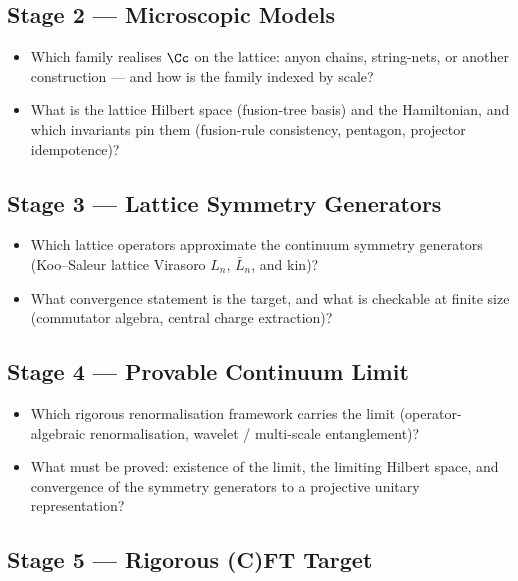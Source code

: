 \subsection{Stage 2 --- Microscopic Models}

\begin{itemize}
  \item Which family realises $\Cc$ on the lattice: anyon chains, string-nets,
  or another construction --- and how is the family indexed by scale?
  \item What is the lattice Hilbert space (fusion-tree basis) and the
  Hamiltonian, and which invariants pin them (fusion-rule consistency, pentagon,
  projector idempotence)?
\end{itemize}

\subsection{Stage 3 --- Lattice Symmetry Generators}

\begin{itemize}
  \item Which lattice operators approximate the continuum symmetry generators
  (Koo--Saleur lattice Virasoro $L_n$, $\bar L_n$, and kin)?
  \item What convergence statement is the target, and what is checkable at finite
  size (commutator algebra, central charge extraction)?
\end{itemize}

\subsection{Stage 4 --- Provable Continuum Limit}

\begin{itemize}
  \item Which rigorous renormalisation framework carries the limit (operator-
  algebraic renormalisation, wavelet / multi-scale entanglement)?
  \item What must be proved: existence of the limit, the limiting Hilbert space,
  and convergence of the symmetry generators to a projective unitary
  representation?
\end{itemize}

\subsection{Stage 5 --- Rigorous (C)FT Target}

